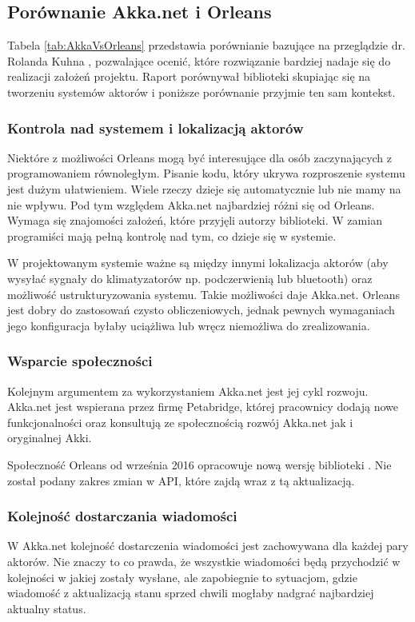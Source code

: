 \subsection{Porównanie Akka.net i Orleans}
Tabela \ref{tab:AkkaVsOrleans} przedstawia porównianie bazujące na przeglądzie dr. Rolanda Kuhna \cite{bib:AkkaVsOrleans}, pozwalające ocenić, które rozwiązanie bardziej nadaje się do realizacji założeń projektu. Raport porównywał biblioteki skupiając się na tworzeniu systemów aktorów i poniższe porównanie przyjmie ten sam kontekst.

\subsubsection*{Kontrola nad systemem i lokalizacją aktorów}
Niektóre z możliwości Orleans mogą być interesujące dla osób zaczynających z programowaniem równoległym. 
Pisanie kodu, który ukrywa rozproszenie systemu jest dużym ułatwieniem. 
Wiele rzeczy dzieje się automatycznie lub nie mamy na nie wpływu. 
Pod tym względem Akka.net najbardziej różni się od Orleans. Wymaga się znajomości założeń, które przyjęli autorzy biblioteki. W zamian programiści mają pełną kontrolę nad tym, co dzieje się w systemie.

W projektowanym systemie ważne są między innymi lokalizacja aktorów (aby wysyłać sygnały do klimatyzatorów np. podczerwienią lub bluetooth) oraz możliwość ustrukturyzowania systemu. 
Takie możliwości daje Akka.net. Orleans jest dobry do zastosowań czysto obliczeniowych, jednak pewnych wymaganiach jego konfiguracja byłaby uciążliwa lub wręcz niemożliwa do zrealizowania.

\subsubsection*{Wsparcie społeczności}
Kolejnym argumentem za wykorzystaniem Akka.net jest jej cykl rozwoju.
Akka.net jest wspierana przez firmę Petabridge, której pracownicy dodają nowe funkcjonalności oraz konsultują ze społecznością rozwój Akka.net jak i oryginalnej Akki. 

Społeczność Orleans od września 2016 opracowuje nową wersję biblioteki \cite{bib:Orleans2}. Nie został podany zakres zmian w API, które zajdą wraz z tą aktualizacją. 

\subsubsection*{Kolejność dostarczania wiadomości}
W Akka.net kolejność dostarczenia wiadomości jest zachowywana dla każdej pary aktorów. Nie znaczy to co prawda, że wszystkie wiadomości będą przychodzić w kolejności w jakiej zostały wysłane, ale zapobiegnie to sytuacjom, gdzie wiadomość z aktualizacją stanu sprzed chwili mogłaby nadgrać najbardziej aktualny status.

